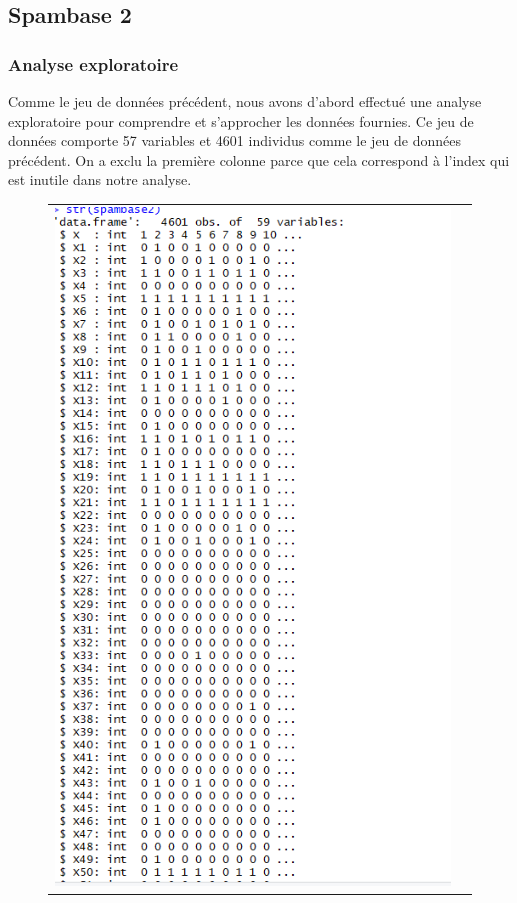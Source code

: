 \documentclass[a4paper,11pt,oneside,roman]{article}
\begin{document}
\subsection{Spambase 2}
\subsubsection{Analyse exploratoire}
Comme le jeu de données précédent, nous avons d'abord effectué une analyse exploratoire pour comprendre et s'approcher les données fournies. \newline
Ce jeu de données comporte 57 variables et 4601 individus comme le jeu de données précédent. On a exclu la première colonne parce que cela correspond à l'index qui est inutile dans notre analyse.
\begin{figure}[htb]
    \centering
    \begin{tabular}{cc}
    \includegraphics[scale = .3]{./discrimination/spambase2/str.PNG} &

\end{tabular}
\end{figure}
\end{document}

